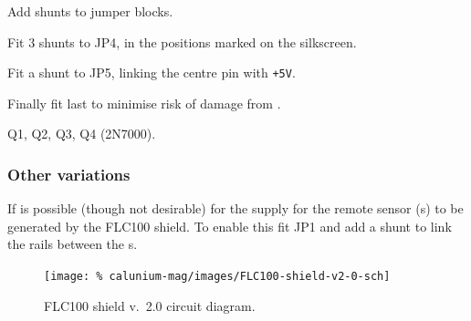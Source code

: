 Add shunts to jumper blocks.
\begin{buildorder*}
\item Fit 3 shunts to JP4, in the positions marked on the silkscreen.
\item Fit a shunt to JP5, linking the centre pin with \texttt{+5V}.
\end{buildorder*}


Finally fit last to minimise risk of damage from \esd.
\begin{buildorder*}
\item Q1, Q2, Q3, Q4 (2N7000).
\end{buildorder*}


\subsubsection{Other variations}
If is possible (though not desirable) for the  supply for the
remote sensor \pcb{}(s) to be generated by the FLC100 shield. To enable
this fit JP1 and add a shunt to link the  rails between the
\pcb{}s.


\begin{landscape}
  \begin{figure}[p]
    \centering
    \texttt{[image: \%
      calunium-mag/images/FLC100-shield-v2-0-sch]}
    \caption{FLC100 shield v.~2.0 circuit diagram.}
    \label{fig:flc100-shield-v2.0-cct-diag}
  \end{figure}
\end{landscape}
